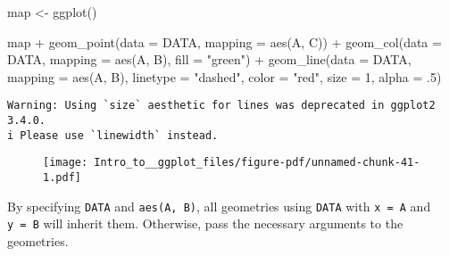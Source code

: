 \documentclass[
  letterpaper,
  DIV=11,
  numbers=noendperiod]{scrartcl}
\newenvironment{Shaded}{\begin{snugshade}}{\end{snugshade}}
\newcommand{\AttributeTok}[1]{\textcolor[rgb]{0.40,0.45,0.13}{#1}}
\newcommand{\DecValTok}[1]{\textcolor[rgb]{0.68,0.00,0.00}{#1}}
\newcommand{\FunctionTok}[1]{\textcolor[rgb]{0.28,0.35,0.67}{#1}}
\newcommand{\NormalTok}[1]{\textcolor[rgb]{0.00,0.23,0.31}{#1}}
\newcommand{\OtherTok}[1]{\textcolor[rgb]{0.00,0.23,0.31}{#1}}
\newcommand{\SpecialCharTok}[1]{\textcolor[rgb]{0.37,0.37,0.37}{#1}}
\newcommand{\StringTok}[1]{\textcolor[rgb]{0.13,0.47,0.30}{#1}}
\begin{document}
\begin{Shaded}
\begin{Highlighting}[]
\NormalTok{map }\OtherTok{\textless{}{-}} \FunctionTok{ggplot}\NormalTok{()   }

\NormalTok{map }\SpecialCharTok{+} 
  \FunctionTok{geom\_point}\NormalTok{(}\AttributeTok{data =}\NormalTok{ DATA, }
             \AttributeTok{mapping =} \FunctionTok{aes}\NormalTok{(A, C)) }\SpecialCharTok{+}
  \FunctionTok{geom\_col}\NormalTok{(}\AttributeTok{data =}\NormalTok{ DATA, }
           \AttributeTok{mapping =} \FunctionTok{aes}\NormalTok{(A, B),}
           \AttributeTok{fill =} \StringTok{"green"}\NormalTok{) }\SpecialCharTok{+}
  \FunctionTok{geom\_line}\NormalTok{(}\AttributeTok{data =}\NormalTok{ DATA, }
            \AttributeTok{mapping =} \FunctionTok{aes}\NormalTok{(A, B), }
            \AttributeTok{linetype =} \StringTok{"dashed"}\NormalTok{,}
            \AttributeTok{color =} \StringTok{"red"}\NormalTok{, }
            \AttributeTok{size =} \DecValTok{1}\NormalTok{, }
            \AttributeTok{alpha =}\NormalTok{ .}\DecValTok{5}\NormalTok{)}
\end{Highlighting}
\end{Shaded}

\begin{verbatim}
Warning: Using `size` aesthetic for lines was deprecated in ggplot2 3.4.0.
i Please use `linewidth` instead.
\end{verbatim}

\begin{figure}[H]

{\centering \texttt{[image: Intro\_to\_\_ggplot\_files/figure-pdf/unnamed-chunk-41-1.pdf]}

}

\end{figure}

By specifying \texttt{DATA} and \texttt{aes(A,\ B)}, all geometries
using \texttt{DATA} with \texttt{x\ =\ A} and \texttt{y\ =\ B} will
inherit them. Otherwise, pass the necessary arguments to the geometries.
\end{document}
